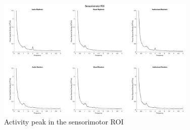 \begin{figure}[H]
    \centering
    \includegraphics[width=0.85\textwidth]{healthy_images/sensorimotorROI_graph.png}
    \caption{Activity peak in the sensorimotor ROI}
    \label{fig: sensorimotor ROI} 
\end{figure} 

\clearpage
